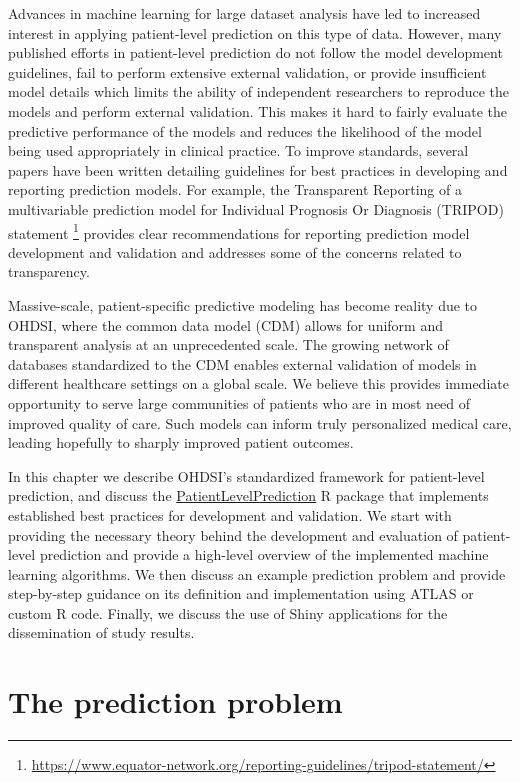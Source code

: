\documentclass[11pt]{book}
\let\rmarkdownfootnote\footnote%
\def\footnote{\protect\rmarkdownfootnote}
\theoremstyle{definition}
\theoremstyle{definition}
\theoremstyle{definition}
\theoremstyle{remark}
\begin{document}
Advances in machine learning for large dataset analysis have led to increased interest in applying patient-level prediction on this type of data. However, many published efforts in patient-level prediction do not follow the model development guidelines, fail to perform extensive external validation, or provide insufficient model details which limits the ability of independent researchers to reproduce the models and perform external validation. This makes it hard to fairly evaluate the predictive performance of the models and reduces the likelihood of the model being used appropriately in clinical practice. To improve standards, several papers have been written detailing guidelines for best practices in developing and reporting prediction models. For example, the Transparent Reporting of a multivariable prediction model for Individual Prognosis Or Diagnosis (TRIPOD) statement \footnote{\url{https://www.equator-network.org/reporting-guidelines/tripod-statement/}} provides clear recommendations for reporting prediction model development and validation and addresses some of the concerns related to transparency.  

Massive-scale, patient-specific predictive modeling has become reality due to OHDSI, where the common data model (CDM) allows for uniform and transparent analysis at an unprecedented scale. The growing network of databases standardized to the CDM enables external validation of models in different healthcare settings on a global scale. We believe this provides immediate opportunity to serve large communities of patients who are in most need of improved quality of care. Such models can inform truly personalized medical care, leading hopefully to sharply improved patient outcomes.

In this chapter we describe OHDSI's standardized framework for patient-level prediction, \citep{reps2018} and discuss the \href{https://ohdsi.github.io/PatientLevelPrediction/}{PatientLevelPrediction} R package that implements established best practices for development and validation. We start with providing the necessary theory behind the development and evaluation of patient-level prediction and provide a high-level overview of the implemented machine learning algorithms. We then discuss an example prediction problem and provide step-by-step guidance on its definition and implementation using ATLAS or custom R code. Finally, we discuss the use of Shiny applications for the dissemination of study results.

\hypertarget{the-prediction-problem}{%
\section{The prediction problem}\label{the-prediction-problem}}
\end{document}

